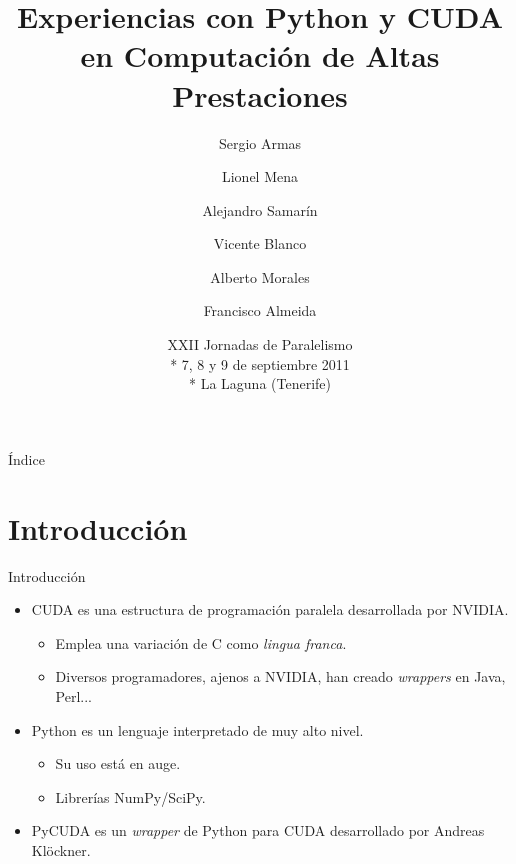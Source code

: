 \documentclass{beamer}
\title[Computación con Python y CUDA] %
{Experiencias con Python y CUDA en Computación de Altas Prestaciones}
\author[S. Armas, L. Mena, A. Samarín \emph{et al}.] %
{Sergio Armas \and Lionel Mena \and Alejandro Samarín \and
 Vicente Blanco\inst{1} \and Alberto Morales \and Francisco Almeida}
\institute[Universidad de La Laguna] %
{
  \inst{1}%
  Departamento de Estadística, I.O. y Computación\\
  Universidad de La Laguna}
\date[JP 2011] %
{XXII Jornadas de Paralelismo\\*
 7, 8 y 9 de septiembre 2011\\*
 La Laguna (Tenerife)}
\begin{document}
\begin{frame}
  \titlepage
\end{frame}

\begin{frame}{Índice}
  \tableofcontents
\end{frame}





\section{Introducción}

\begin{frame}{Introducción}

  \begin{itemize}
  \item
    CUDA es una estructura de programación paralela desarrollada por NVIDIA.   
  \begin{itemize}
    \item Emplea una variación de C como \emph{lingua franca}.
    \item Diversos programadores, ajenos a NVIDIA, han creado \emph{wrappers} en Java, Perl...
  \end{itemize}
  \item
    Python es un lenguaje interpretado de muy alto nivel.
  \begin{itemize}
    \item Su uso está en auge.
    \item Librerías NumPy/SciPy.
  \end{itemize}
  \item
    PyCUDA es un \emph{wrapper} de Python para CUDA desarrollado por Andreas Klöckner.
  \end{itemize}
\end{frame}
\end{document}
